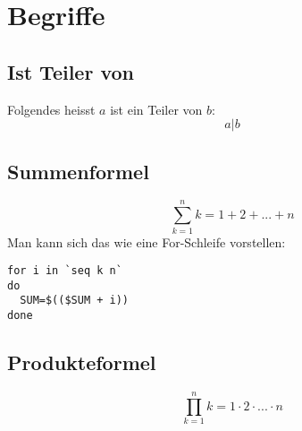 \section{Begriffe}
\subsection{Ist Teiler von}
Folgendes heisst $a$ ist ein Teiler von $b$:
\[ a | b\]
\subsection{Summenformel}
\[\sum \limits_{k=1}^n k = 1 + 2 + ... + n \]
Man kann sich das wie eine For-Schleife vorstellen:
\begin{verbatim}
for i in `seq k n`
do
  SUM=$(($SUM + i))
done
\end{verbatim}
\subsection{Produkteformel}
\[\prod \limits_{k=1}^{n}k = 1\cdot 2\cdot ... \cdot n \]



